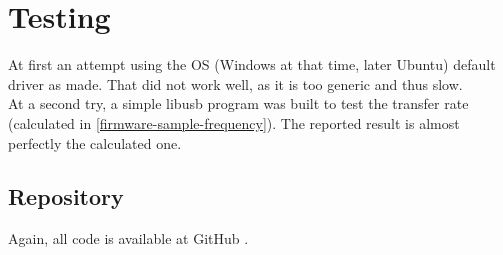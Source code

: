 \section{Testing}
At first an attempt using the OS (Windows at that time, later Ubuntu) default driver
as made. That did not work well, as it is too generic and thus slow. \\
At a second try, a simple libusb \cite{libusb} program was built to test the transfer
rate (calculated in \autoref{firmware-sample-frequency}). The reported result is
almost perfectly the calculated one.

\subsection{Repository}
Again, all code is available at GitHub \cite{guitar-digitizer-firmware}.
